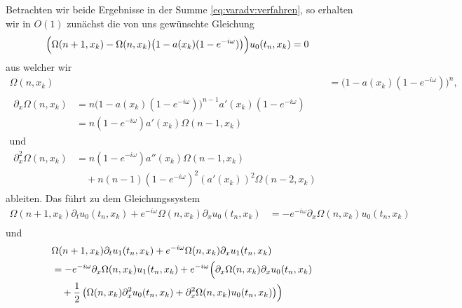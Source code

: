 Betrachten wir beide Ergebnisse in der Summe \eqref{eq:varadv:verfahren}, so erhalten wir in $O(1)$ zunächst die von uns gewünschte Gleichung
\begin{align}
\Bigl( \Omega(n+1, x_k)  - \Omega(n,x_k) \bigl(1 - a(x_k) (1-e^{-i\omega}) \bigr) \Bigr) u_0(t_n, x_k) &= 0
\end{align}
aus welcher wir
\begin{align}
\Omega(n,x_k) &= \bigl(1 - a(x_k) (1-e^{-i\omega}) \bigr)^n,\\
\begin{split}
\partial_x \Omega(n,x_k) &= n \bigl(1 - a(x_k) (1-e^{-i\omega}) \bigr)^{n-1} a'(x_k) (1-e^{-i\omega})\\
&= n (1-e^{-i\omega}) a'(x_k) \Omega(n-1, x_k)
\end{split}\\
\text{und} \nonumber\\
\begin{split}
\partial^2_x \Omega(n,x_k) &= n (1-e^{-i\omega}) a''(x_k) \Omega(n-1, x_k)\\
&\quad + n (n-1) (1-e^{-i\omega})^2 (a'(x_k))^2 \Omega(n-2,x_k)
\end{split}
\end{align}
ableiten.
Das führt zu dem Gleichungssystem
\begin{align}
\Omega(n+1, x_k) \partial_t u_0(t_n, x_k) + e^{-i \omega} \Omega(n,x_k) \partial_x u_0(t_n, x_k) &= - e^{-i \omega} \partial_x \Omega(n,x_k) u_0(t_n, x_k)\\
\end{align}
und
\begin{align}
&\Omega(n+1, x_k) \partial_t u_1(t_n, x_k) + e^{-i \omega} \Omega(n,x_k) \partial_x u_1(t_n, x_k)\\
&=- e^{-i \omega} \partial_x \Omega(n,x_k) u_1(t_n, x_k) + e^{-i\omega} \Bigl( \partial_x \Omega(n, x_k) \partial_x u_0(t_n, x_k)\\
&\quad + \frac 12 \left( \Omega(n,x_k) \partial^2_x u_0(t_n, x_k) + \partial^2_x \Omega(n, x_k) u_0(t_n, x_k) \right) \Bigr)
\end{align}


